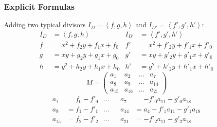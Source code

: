 \documentclass{beamer}
\newcommand{\pid}[1]{\left\langle #1 \right\rangle}
\newcommand\sout[2][black]{
  \setbox0=\hbox{$#2$}
  \rlap{
    \raisebox{.45\ht0}{
      \textcolor{#1}{
        \rule{\wd0}{1pt}
      }
    }
  }#2
}
\begin{document}

\begin{frame}
\frametitle{Explicit Formulas}
  Adding two typical divisors $I_D = \pid{f,g,h}$ and $I_{D'} = \pid{f',g',h'}$:
  \begin{align*}
    I_D &= \pid{f, g, h}           & I_{D'} &= \pid{f', g', h'} \\
    f   &= x^2 + f_2y + f_1x + f_0 & f'     &= x^2 + f'_2y + f'_1x + f'_0 \\
    g   &=  xy + g_2y + g_1x + g_0 & g'     &=  xy + g'_2y + g'_1x + g'_0 \\
    h   &= y^2 + h_2y + h_1x + h_0 & h'     &= y^2 + h'_2y + h'_1x + h'_0
  \end{align*}
  \[ M = \begin{pmatrix}
    a_1 & a_2 & \dots & a_7 \\
    a_8 & a_9 & \dots & a_{14} \\
    a_{15} & a_{16} & \dots & a_{21}
  \end{pmatrix} \]
  \begin{align*}
    a_1    &= f_0 - f'_0 & \dots && a_7    &=     - f'_0a_{11} - g'_0a_{18} \\
    a_8    &= f_1 - f'_1 & \dots && a_{14} &= a_4 - f'_1a_{11} - g'_1a_{18} \\
    a_{15} &= f_2 - f'_2 & \dots && a_{21} &=     - f'_2a_{11} - g'_2a_{18}
  \end{align*}
\end{frame}
\end{document}

